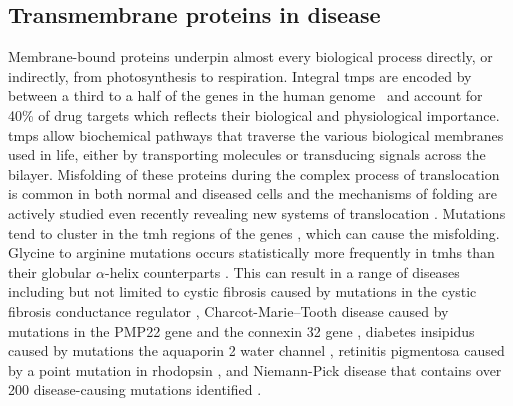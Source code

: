 \subsection{Transmembrane proteins in disease}
Membrane-bound proteins underpin almost every biological process directly, or indirectly, from photosynthesis to respiration.
Integral \gls{tmp}s are encoded by between a third to a half of the genes in the human genome~\cite{Hopkins2002, Almen2009, Wang2013} and account for 40\% of drug targets \cite{Overington2006} which reflects their biological and physiological importance.
\gls{tmp}s allow biochemical pathways that traverse the various biological membranes used in life, either by transporting molecules or transducing signals across the bilayer.
Misfolding of these proteins during the complex process of translocation is common in both normal and diseased cells and the mechanisms of folding are actively studied even recently revealing new systems of translocation \cite{Shurtleff2018}.
Mutations tend to cluster in the \gls{tmh} regions of the genes \cite{Sanders2004}, which can cause the misfolding.
Glycine to arginine mutations occurs statistically more frequently in \gls{tmh}s than their globular $\alpha$\--helix counterparts \cite{Partridge2002}.
This can result in a range of diseases including but not limited to cystic fibrosis caused by mutations in the cystic fibrosis conductance regulator \cite{Riordan1989}, Charcot\--Marie\---Tooth disease caused by mutations in the PMP22 gene \cite{Roa1993} and the connexin 32 gene \cite{Fairweather1994}, diabetes insipidus caused by mutations the aquaporin 2 water channel \cite{vanLieburg1994}, retinitis pigmentosa caused by a point mutation in rhodopsin \cite{Dryja1990}, and Niemann\--Pick disease that contains over 200 disease\--causing mutations identified \cite{Gelsthorpe2008, Park2003, Scott2004, Fernandez-Valero2005}.

